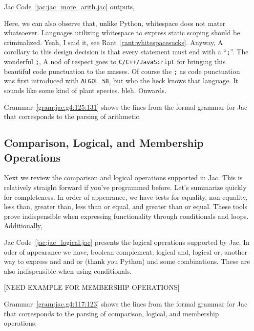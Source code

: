 
Jac Code~\ref{jac:jac_more_arith.jac} outputs,


Here, we can also observe that, unlike Python, whitespace does not mater whatsoever. Languages utilizing whitespace to express static scoping should be criminalized. Yeah, I said it, see Rant~\ref{rant:whitespacesucks}. Anyway, A corollary to this design decision is that every statement must end with a ``\lstinline{;}''. The wonderful \lstinline{;}, A nod of respect goes to \texttt{C/C++/JavaScript} for bringing this beautiful code punctuation to the masses. Of course the \lstinline{;} as code punctuation was first introduced with \texttt{ALGOL 58}, but who the heck knows that language. It sounds like some kind of plant species. \Gls{bleh}. Onwards.

\begin{nerd}
    Grammar~\ref{gram:jac.g4:125:131} shows  the lines from the formal grammar for Jac that corresponds to the parsing of arithmetic.
\end{nerd}

\subsection{Comparison, Logical, and Membership Operations}
Next we review the comparison and logical operations supported in Jac. This is relatively straight forward if you've programmed before. Let's summarize quickly for completeness.
In order of appearance, we have tests for equality, non equality, less than, greater than, less than or equal, and greater than or equal. These tools prove indispensible when expressing functionality through conditionals and loops. Additionally,

Jac Code~\ref{jac:jac_logical.jac} presents the logical operations supported by Jac. In oder of appearance we have, boolean complement, logical and, logical or, another way to express and and or (thank you Python) and some combinations. These are also indispensible when using conditionals.

[NEED EXAMPLE FOR MEMBERSHIP OPERATIONS]

\begin{nerd}
    Grammar~\ref{gram:jac.g4:117:123} shows the lines from the formal grammar for Jac that corresponds to the parsing of comparison, logical, and membership operations.
\end{nerd}

